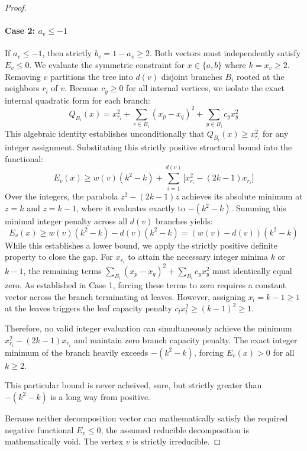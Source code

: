 \documentclass[12pt]{article}
\newcommand{\review}[1]{\begin{reviewbox}#1\end{reviewbox}}
\begin{document}
\begin{proof}
\paragraph{Case 2: $a_v \le -1$}
If $a_v \le -1$, then strictly $b_v = 1 - a_v \ge 2$. Both vectors must independently satisfy $E_v \le 0$. We evaluate the symmetric constraint for $x \in \{a, b\}$ where $k = x_v \ge 2$. 
Removing $v$ partitions the tree into $d(v)$ disjoint branches $B_i$ rooted at the neighbors $r_i$ of $v$. Because $c_y \ge 0$ for all internal vertices, we isolate the exact internal quadratic form for each branch:
\[
Q_{B_i}(x) = x_{r_i}^2 + \sum_{e \in B_i} (x_p - x_q)^2 + \sum_{y \in B_i} c_y x_y^2
\]
This algebraic identity establishes unconditionally that $Q_{B_i}(x) \ge x_{r_i}^2$ for any integer assignment. 
Substituting this strictly positive structural bound into the functional:
\[
E_v(x) \ge w(v)(k^2 - k) + \sum_{i=1}^{d(v)} \big[ x_{r_i}^2 - (2k-1)x_{r_i} \big]
\]
Over the integers, the parabola $z^2 - (2k-1)z$ achieves its absolute minimum at $z = k$ and $z = k-1$, where it evaluates exactly to $-(k^2 - k)$. 
Summing this minimal integer penalty across all $d(v)$ branches yields:
\[
E_v(x) \ge w(v)(k^2 - k) - d(v)(k^2 - k) = (w(v) - d(v))(k^2 - k)
\]
While this establishes a lower bound, we apply the strictly positive definite property to close the gap. For $x_{r_i}$ to attain the necessary integer minima $k$ or $k-1$, the remaining terms $\sum_{B_i} (x_p - x_q)^2 + \sum_{B_i} c_y x_y^2$ must identically equal zero. As established in Case 1, forcing these terms to zero requires a constant vector across the branch terminating at leaves. However, assigning $x_l = k-1 \ge 1$ at the leaves triggers the leaf capacity penalty $c_l x_l^2 \ge (k-1)^2 \ge 1$. 

Therefore, no valid integer evaluation can simultaneously achieve the minimum $x_{r_i}^2 - (2k-1)x_{r_i}$ and maintain zero branch capacity penalty. The exact integer minimum of the branch heavily exceeds $-(k^2-k)$, forcing $E_v(x) > 0$ for all $k \ge 2$. 

\review{This particular bound is never acheived, sure, but strictly greater than $-(k^2-k)$ is a long way from positive.}

Because neither decomposition vector can mathematically satisfy the required negative functional $E_v \le 0$, the assumed reducible decomposition is mathematically void. The vertex $v$ is strictly irreducible.
\end{proof}
\end{document}
